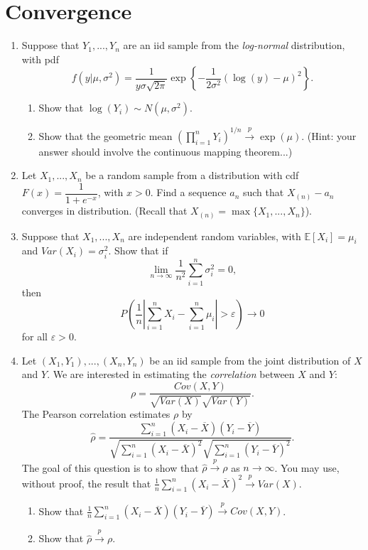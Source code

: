 \documentclass[11pt]{article}
\begin{document}
\newpage

\section*{Convergence}

\begin{enumerate}
\item Suppose that $Y_1,...,Y_n$ are an iid sample from the \textit{log-normal} distribution, with pdf
$$f(y|\mu, \sigma^2) = \frac{1}{y \sigma \sqrt{2 \pi}} \exp \left\lbrace -\frac{1}{2\sigma^2} (\log(y) - \mu)^2 \right\rbrace.$$

\begin{enumerate}
\item Show that $\log(Y_i) \sim N(\mu, \sigma^2)$.
\item Show that the geometric mean $\left( \prod \limits_{i=1}^n Y_i \right)^{1/n} \overset{p}{\to} \exp(\mu)$. (Hint: your answer should involve the continuous mapping theorem...)
\end{enumerate}

\item Let $X_1,...,X_n$ be a random sample from a distribution with cdf $F(x) = \dfrac{1}{1 + e^{-x}}$, with $x > 0$. Find a sequence $a_n$ such that $X_{(n)} - a_n$ converges in distribution. (Recall that $X_{(n)} = \max \{X_1,...,X_n\}$).

\item Suppose that $X_1,...,X_n$ are independent random variables, with $\mathbb{E}[X_i] = \mu_i$ and $Var(X_i) = \sigma_i^2$. Show that if 
$$\lim \limits_{n \to \infty} \frac{1}{n^2} \sum \limits_{i=1}^n \sigma_i^2 = 0,$$
then 
$$P \left( \frac{1}{n} \left\lvert \sum \limits_{i=1}^n X_i - \sum \limits_{i=1}^n \mu_i \right\rvert > \varepsilon \right) \to 0$$
for all $\varepsilon > 0$.

\item Let $(X_1, Y_1),...,(X_n, Y_n)$ be an iid sample from the joint distribution of $X$ and $Y$. We are interested in estimating the \textit{correlation} between $X$ and $Y$:
$$\rho = \frac{Cov(X, Y)}{\sqrt{Var(X)} \sqrt{Var(Y)}}.$$
The Pearson correlation estimates $\rho$ by
$$\widehat{\rho} = \frac{\sum \limits_{i=1}^n (X_i - \overline{X})(Y_i - \overline{Y})}{\sqrt{\sum \limits_{i=1}^n (X_i - \overline{X})^2} \sqrt{\sum \limits_{i=1}^n (Y_i - \overline{Y})^2}}.$$
The goal of this question is to show that $\widehat{\rho} \overset{p}{\to} \rho$ as $n \to \infty$. You may use, without proof, the result that $\frac{1}{n} \sum \limits_{i=1}^n (X_i - \overline{X})^2 \overset{p}{\to} Var(X)$.

\begin{enumerate}
\item Show that $\frac{1}{n} \sum \limits_{i=1}^n (X_i - \overline{X})(Y_i - \overline{Y}) \overset{p}{\to} Cov(X, Y)$. 

\item Show that $\widehat{\rho} \overset{p}{\to} \rho$.
\end{enumerate}
\end{enumerate}
\end{document}
